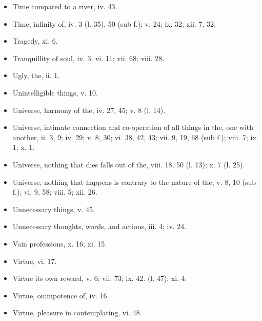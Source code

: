 \begin{itemize}[leftmargin=*]
\setlength\itemsep{0em}
\item
  Time compared to a river, iv. 43.
\item
  Time, infinity of, iv. 3 (l. 35), 50 (sub f.); v. 24; ix. 32; xii. 7,
  32.
\item
  Tragedy, xi. 6.
\item
  Tranquillity of soul, iv. 3; vi. 11; vii. 68; viii. 28.
\end{itemize}

\begin{itemize}[leftmargin=*]
\setlength\itemsep{0em}
\item
  Ugly, the, ii. 1.
\item
  Unintelligible things, v. 10.
\item
  Universe, harmony of the, iv. 27, 45; v. 8 (l. 14).
\item
  Universe, intimate connection and co-operation of all things in the,
  one with another, ii. 3, 9; iv. 29; v. 8, 30; vi. 38, 42, 43; vii. 9,
  19, 68 (sub f.); viii. 7; ix. 1; x. 1.
\item
  Universe, nothing that dies falls out of the, viii. 18, 50 (l. 13); x.
  7 (l. 25).
\item
  Universe, nothing that happens is contrary to the nature of the, v. 8,
  10 (sub f.); vi. 9, 58; viii. 5; xii. 26.
\item
  Unnecessary things, v. 45.
\item
  Unnecessary thoughts, words, and actions, iii. 4; iv. 24.
\end{itemize}

\begin{itemize}[leftmargin=*]
\setlength\itemsep{0em}
\item
  Vain professions, x. 16; xi. 15.
\item
  Virtue, vi. 17.
\item
  Virtue its own reward, v. 6; vii. 73; ix. 42. (l. 47); xi. 4.
\item
  Virtue, omnipotence of, iv. 16.
\item
  Virtue, pleasure in contemplating, vi. 48.
\end{itemize}

